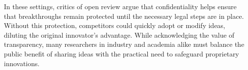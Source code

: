 
In these settings, critics of open review argue that confidentiality helps ensure that breakthroughs remain protected until the necessary legal steps are in place. Without this protection, competitors could quickly adopt or modify ideas, diluting the original innovator’s advantage. While acknowledging the value of transparency, many researchers in industry and academia alike must balance the public benefit of sharing ideas with the practical need to safeguard proprietary innovations.